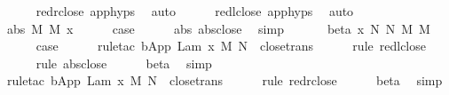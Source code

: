 \begin{isabellebody}
\ \ \ \ \isamarkupfalse%
\ red{\isacharunderscore}r{\isacharunderscore}close\ app{\isachardot}hyps{\isacharparenleft}{}{\isacharparenright}\ \isamarkupfalse%
\ auto{\isacharbrackleft}{}{\isacharbrackright}\isanewline
\ \ \ \ \isamarkupfalse%
\ red{\isacharunderscore}l{\isacharunderscore}close\ app{\isachardot}hyps{\isacharparenleft}{}{\isacharparenright}\ \isamarkupfalse%
\ auto{\isacharbrackleft}{}{\isacharbrackright}\isanewline
\ \ \isamarkupfalse%
\isanewline
\ \ \isamarkupfalse%
\ {\isacharparenleft}abs\ M\ M{\isacharprime}\ x{\isacharparenright}\isanewline
\ \ \ \ \isamarkupfalse%
\ {\isacharquery}case\isanewline
\ \ \ \ \isamarkupfalse%
\ abs\ abs{\isacharunderscore}close\ \isamarkupfalse%
\ simp\isanewline
\ \ \isamarkupfalse%
\isanewline
\ \ \isamarkupfalse%
\ {\isacharparenleft}beta\ x\ N\ N{\isacharprime}\ M\ M{\isacharprime}{\isacharparenright}\isanewline
\ \ \ \ \isamarkupfalse%
\ {\isacharquery}case\isanewline
\ \ \ \ \isamarkupfalse%
\ {\isacharparenleft}rule{\isacharunderscore}tac\ b{\isacharequal}{\isachardoublequoteopen}App\ {\isacharparenleft}Lam\ {\isacharbrackleft}x{\isacharbrackright}{\isachardot}\ M{\isacharprime}{\isacharparenright}\ N{\isachardoublequoteclose}\ \ close{\isachardot}trans{\isacharparenright}\isanewline
\ \ \ \ \isamarkupfalse%
\ {\isacharparenleft}rule\ red{\isacharunderscore}l{\isacharunderscore}close{\isacharparenright}\isanewline
\ \ \ \ \isamarkupfalse%
\ {\isacharparenleft}rule\ abs{\isacharunderscore}close{\isacharparenright}\isanewline
\ \ \ \ \isamarkupfalse%
\ beta\ \isamarkupfalse%
\ simp\isanewline
\ \ \ \ \isamarkupfalse%
\ {\isacharparenleft}rule{\isacharunderscore}tac\ b{\isacharequal}{\isachardoublequoteopen}App\ {\isacharparenleft}Lam\ {\isacharbrackleft}x{\isacharbrackright}{\isachardot}\ M{\isacharprime}{\isacharparenright}\ N{\isacharprime}{\isachardoublequoteclose}\ \ close{\isachardot}trans{\isacharparenright}\isanewline
\ \ \ \ \isamarkupfalse%
\ {\isacharparenleft}rule\ red{\isacharunderscore}r{\isacharunderscore}close{\isacharparenright}\isanewline
\ \ \ \ \isamarkupfalse%
\ beta\ \isamarkupfalse%
\ simp\isanewline
\ \ \ \ \isamarkupfalse%

\end{isabellebody}
